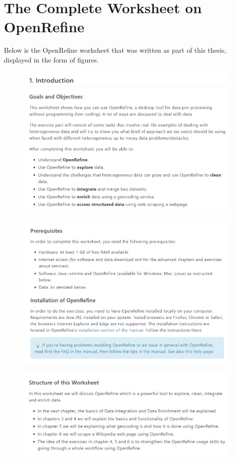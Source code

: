 \chapter{The Complete Worksheet on OpenRefine}
Below is the OpenRefine worksheet that was written as part of this thesis, displayed in the form of figures.
\begin{figure}[H]
    \includegraphics[width=\linewidth]{./Figures/Appendices/worksheet/1.png}
\end{figure}
\begin{figure}[H]
    \includegraphics[width=\linewidth]{./Figures/Appendices/worksheet/2.png}
\end{figure}
\begin{figure}[H]
    \includegraphics[width=\linewidth]{./Figures/Appendices/worksheet/3.png}
\end{figure}
